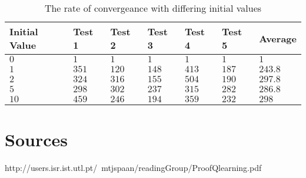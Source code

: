 \documentclass[12pt]{article}
\begin{document}
\begin{table}[]
\centering
\begin{tabular}{|l|l|l|l|l|l|l|}
\hline
Initial Value & Test 1 & Test 2 & Test 3 & Test 4 & Test 5 & Average \\ \hline
$0$       & $1$      & $1$      & $1$      & $1$      & $1$      & $1$       \\ \hline
$1$       & $351$    & $120$    & $148$    & $413$    & $187$    & $243.8$   \\ \hline
$2$       & $324$    & $316$    & $155$    & $504$    & $190$    & $297.8$   \\ \hline
$5$       & $298$    & $302$    & $237$    & $315$    & $282$    & $286.8$   \\ \hline
$10$      & $459$    & $246$    & $194$    & $359$    & $232$    & $298$     \\ \hline
\end{tabular}
\caption{The rate of convergeance with differing initial values}
\label{my-label}
\end{table}

\section{Sources}
http://users.isr.ist.utl.pt/~mtjspaan/readingGroup/ProofQlearning.pdf
\end{document}
